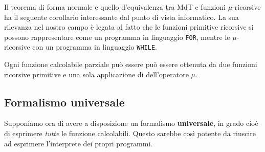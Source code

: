 Il teorema di forma normale e quello d'equivalenza tra MdT e
funzioni $\mu$-ricorsive ha il seguente corollario interessante
dal punto di vista informatico. La sua rilevanza nel nostro
campo è legata al fatto che le funzioni primitive ricorsive
si possono rappresentare come un programma in linguaggio
\verb|FOR|, mentre le $\mu$-ricorsive con un programma in
linguaggio \verb|WHILE|.

\begin{corollary}
	Ogni funzione calcolabile parziale può essere può essere
	ottenuta da due funzioni ricorsive primitive e una sola
	applicazione di dell'operatore $\mu$.
\end{corollary}

\subsection{Formalismo universale}
Supponiamo ora di avere a disposizione un formalismo
\textbf{universale}, in grado cioè di esprimere \emph{tutte}
le funzione calcolabili. Questo sarebbe così potente da
riuscire ad esprimere l'interprete dei propri programmi.

